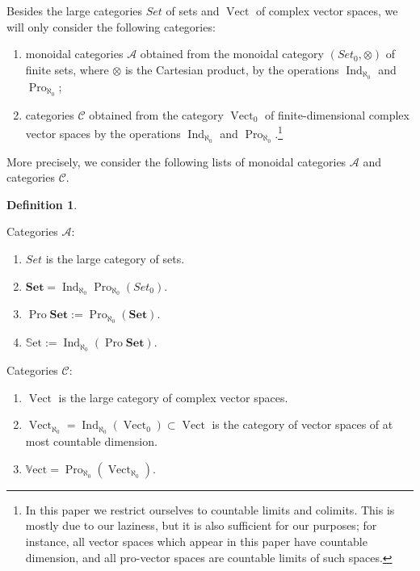 \documentclass[11pt,a4paper,twoside]{amsart}
\theoremstyle{definition}
\newtheorem{definition}[theorem]{Definition}
\theoremstyle{remark}
\newcommand{\mcA}{\mathcal A}
\newcommand{\mcC}{\mathcal C}
\newcommand{\Vect}{\operatorname{Vect}}
\newcommand{\Ind}{\operatorname{Ind}}
\newcommand{\Pro}{\operatorname{Pro}}
\newcommand{\bSet}{\mathbf{Set}}
\newcommand{\mSet}{\mathbb{S}\mathrm{et}}
\newcommand{\mVect}{\mathbb{V}\mathrm{ect}}
\begin{document}
Besides the large categories $Set$ of sets and $\Vect$ of complex vector spaces, we will only consider the following categories:

\begin{enumerate}

\item monoidal categories $\mcA$ obtained from the monoidal category $(Set_0,\otimes)$ of finite sets, where $\otimes$ is the Cartesian product, by the operations $\Ind_{\aleph_0}$ and $\Pro_{\aleph_0}$;

\item categories $\mcC$ obtained from the category $\Vect_0$ of finite-dimensional complex vector spaces by the operations $\Ind_{\aleph_0}$ and $\Pro_{\aleph_0}$.\footnote{In this paper we restrict ourselves to countable limits and colimits. This is mostly due to our laziness, but it is also sufficient for our purposes; for instance, all vector spaces which appear in this paper have countable dimension, and all pro-vector spaces are countable limits of such spaces.}

\end{enumerate}

More precisely, we consider the following lists of monoidal categories $\mcA$ and categories $\mcC$.

\begin{definition}\label{cat}

Categories $\mcA$:

\begin{enumerate}

\item $Set$ is the large category of sets.

\item $\bSet=\Ind_{\aleph_0}\Pro_{\aleph_0}(Set_0)$.

\item $\Pro\bSet:=\Pro_{\aleph_0}(\bSet)$.

\item $\mSet:=\Ind_{\aleph_0}(\Pro\bSet)$.

\end{enumerate}

Categories $\mcC$:

\begin{enumerate}

\item $\Vect$ is the large category of complex vector spaces.

\item $\Vect_{\aleph_0}=\Ind_{\aleph_0}(\Vect_0)\subset\Vect$ is the category of vector spaces of at most countable dimension.

\item $\mVect=\Pro_{\aleph_0}(\Vect_{\aleph_0})$.

\end{enumerate}

\end{definition}
\end{document}
